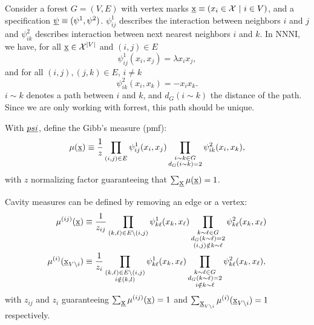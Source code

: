 \documentclass[12pt]{article}
\newcommand{\BS}{\backslash}
\newcommand{\XX}{\mathcal{X}}
\newcommand{\UBX}{\underbar{\textbf{\normalfont x}}}
\numberwithin{equation}{section}
\begin{document}
Consider a forest $G = (V, E)$ with vertex marks $\UBX\equiv (x_i\in\XX\ |\ i\in V)$, and a specification \(\underbar{$\psi$}\equiv(\psi^1, \psi^2)\). $\psi^1_{ij}$ describes the interaction between neighbors $i$ and $j$ and $\psi^2_{ik}$ describes interaction between next nearest neighbors $i$ and $k$. In NNNI, we have, for all $\UBX\in \XX^{|V|}$ and $(i, j)\in E$
\begin{equation}\label{Eq.NNNI-BP-Psi1}
    \psi^1_{ij}(x_i, x_j) = \lambda x_ix_j,
\end{equation}
and for all $(i, j), (j, k)\in E$, $i\neq k$
\begin{equation}\label{Eq.NNNI-BP-Psi2}
    \psi^2_{ik}(x_i, x_k) = - x_ix_k.
\end{equation}
$i\sim k$ denotes a path between $i$ and $k$, and $d_G(i\sim k)$ the distance of the path. Since we are only working with forrest, this path
should be unique.

With \(\underbar{$psi$}\), define the Gibb's measure (pmf):
\begin{equation}\label{Eq.NNNI-BP-Gibbs}
    \mu(\UBX) \equiv \frac{1}{z}\prod_{(i,j)\in E} \psi^1_{ij}(x_i, x_j)\prod_{\substack{i\sim k\in G\\d_G(i\sim k)=2}} \psi^2_{ik}(x_i, x_k),
\end{equation}
with $z$ normalizing factor guaranteeing that $\sum_{\UBX}\mu(\UBX) = 1$.

Cavity measures can be defined by removing an edge or a vertex:
\begin{align}
    \mu^{(ij)}(\UBX)         & \equiv \frac{1}{z_{ij}}\prod_{(k,\ell)\in E\BS (i,j)} \psi^1_{k\ell}(x_k, x_\ell)\prod_{\substack{k\sim \ell\in G \\d_G(k\sim \ell)=2\\(i,j)\notin k\sim \ell}} \psi^2_{k\ell}(x_k, x_\ell) \label{Eq.NNNI-BP-CE}\\
    \mu^{(i)}(\UBX_{V\BS i}) & \equiv \frac{1}{z_{i}}\prod_{\substack{(k,\ell)\in E\BS (i,j)                                                     \\i\notin (k, l)}} \psi^1_{k\ell}(x_k, x_\ell)\prod_{\substack{k\sim \ell\in G\\d_G(k\sim \ell)=2\\i \notin k\sim \ell}} \psi^2_{k\ell}(x_k, x_\ell), \label{Eq.NNNI-BP-CV}
\end{align}
with $z_{ij}$ and $z_i$ guaranteeing $\sum_{\UBX}\mu^{(ij)}(\UBX) = 1$ and $\sum_{\UBX_{V\BS i}}\mu^{(i)}(\UBX_{V\BS i}) = 1$ respectively.
\end{document}
